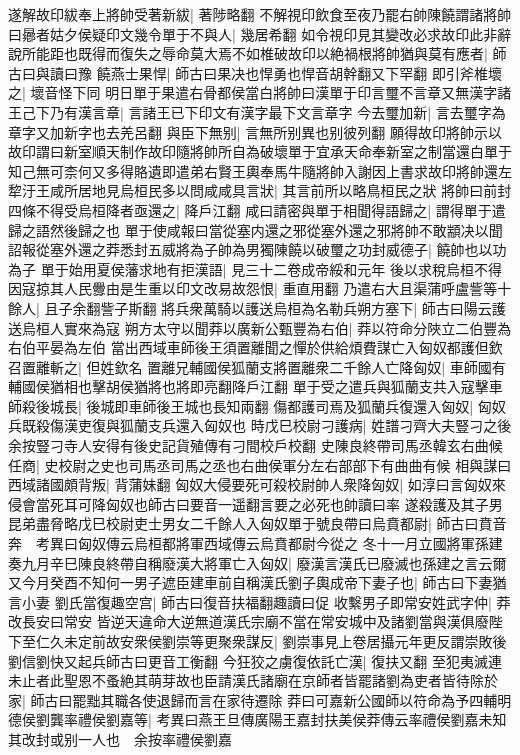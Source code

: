 遂解故印紱奉上將帥受著新紱|{
	著陟略翻}
不解視印飲食至夜乃罷右帥陳饒謂諸將帥曰曏者姑夕侯疑印文幾令單于不與人|{
	幾居希翻}
如令視印見其變改必求故印此非辭說所能距也既得而復失之辱命莫大焉不如椎破故印以絶禍根將帥猶與莫有應者|{
	師古曰與讀曰豫}
饒燕士果悍|{
	師古曰果决也悍勇也悍音胡幹翻又下罕翻}
即引斧椎壞之|{
	壞音怪下同}
明日單于果遣右骨都侯當白將帥曰漢單于印言璽不言章又無漢字諸王己下乃有漢言章|{
	言諸王已下印文有漢字最下文言章字}
今去璽加新|{
	言去璽字為章字又加新字也去羌呂翻}
與臣下無别|{
	言無所别異也别彼列翻}
願得故印將帥示以故印謂曰新室順天制作故印隨將帥所自為破壞單于宜承天命奉新室之制當還白單于知己無可柰何又多得賂遺即遣弟右賢王輿奉馬牛隨將帥入謝因上書求故印將帥還左犂汙王咸所居地見烏桓民多以問咸咸具言狀|{
	其言前所以略鳥桓民之狀}
將帥曰前封四條不得受烏桓降者亟還之|{
	降戶江翻}
咸曰請密與單于相聞得語歸之|{
	謂得單于遣歸之語然後歸之也}
單于使咸報曰當從塞内還之邪從塞外還之邪將帥不敢顓决以聞詔報從塞外還之莽悉封五威將為子帥為男獨陳饒以破璽之功封威德子|{
	饒帥也以功為子}
單于始用夏侯藩求地有拒漢語|{
	見三十二卷成帝綏和元年}
後以求稅烏桓不得因寇掠其人民釁由是生重以印文改易故怨恨|{
	重直用翻}
乃遣右大且渠蒲呼盧訾等十餘人|{
	且子余翻訾子斯翻}
將兵衆萬騎以護送烏桓為名勒兵朔方塞下|{
	師古曰陽云護送烏桓人實來為寇}
朔方太守以聞莽以廣新公甄豐為右伯|{
	莽以符命分陜立二伯豐為右伯平晏為左伯}
當出西域車師後王須置離聞之憚於供給煩費謀亡入匈奴都護但欽召置離斬之|{
	但姓欽名}
置離兄輔國侯狐蘭支將置離衆二千餘人亡降匈奴|{
	車師國有輔國侯猶相也擊胡侯猶將也將即亮翻降戶江翻}
單于受之遣兵與狐蘭支共入寇擊車師殺後城長|{
	後城即車師後王城也長知兩翻}
傷都護司焉及狐蘭兵復還入匈奴|{
	匈奴兵既殺傷漢吏復與狐蘭支兵還入匈奴也}
時戊巳校尉刁護病|{
	姓譜刁齊大夫豎刁之後余按豎刁寺人安得有後史記貨殖傳有刁間校戶校翻}
史陳良終帶司馬丞韓玄右曲候任商|{
	史校尉之史也司馬丞司馬之丞也右曲侯軍分左右部部下有曲曲有候}
相與謀曰西域諸國頗背叛|{
	背蒲妹翻}
匈奴大侵要死可殺校尉帥人衆降匈奴|{
	如淳曰言匈奴來侵會當死耳可降匈奴也師古曰要音一遥翻言要之必死也帥讀曰率}
遂殺護及其子男昆弟盡脅略戊巳校尉吏士男女二千餘人入匈奴單于號良帶曰烏賁都尉|{
	師古曰賁音奔　考異曰匈奴傳云烏桓都將軍西域傳云烏賁都尉今從之}
冬十一月立國將軍孫建奏九月辛巳陳良終帶自稱廢漢大將軍亡入匈奴|{
	廢漢言漢氏已廢滅也孫建之言云爾}
又今月癸酉不知何一男子遮臣建車前自稱漢氏劉子輿成帝下妻子也|{
	師古曰下妻猶言小妻}
劉氏當復趣空宫|{
	師古曰復音扶福翻趣讀曰促}
收繫男子即常安姓武字仲|{
	莽改長安曰常安}
皆逆天違命大逆無道漢氏宗廟不當在常安城中及諸劉當與漢俱廢陛下至仁久未定前故安衆侯劉崇等更聚衆謀反|{
	劉崇事見上卷居攝元年更反謂崇敗後劉信劉快又起兵師古曰更音工衡翻}
今狂狡之虜復依託亡漢|{
	復扶又翻}
至犯夷滅連未止者此聖恩不蚤絶其萌芽故也臣請漢氏諸廟在京師者皆罷諸劉為吏者皆待除於家|{
	師古曰罷黜其職各使退歸而言在家待遷除}
莽曰可嘉新公國師以符命為予四輔明德侯劉龔率禮侯劉嘉等|{
	考異曰燕王旦傳廣陽王嘉封扶美侯莽傳云率禮侯劉嘉未知其改封或别一人也　余按率禮侯劉嘉}


